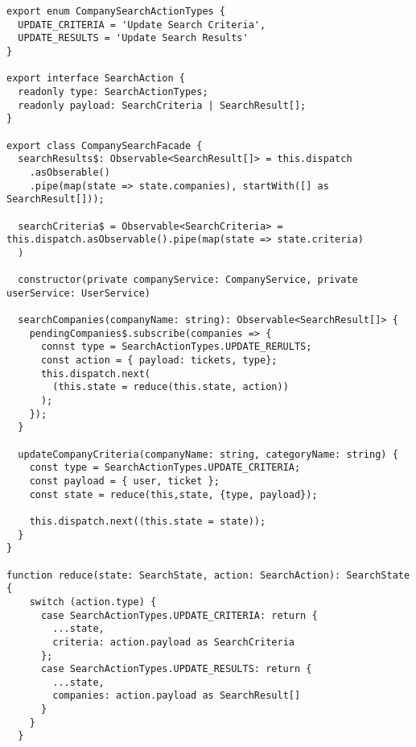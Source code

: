 \begin{lstlisting}[caption=company-search.facade.ts]
export enum CompanySearchActionTypes {
  UPDATE_CRITERIA = 'Update Search Criteria',
  UPDATE_RESULTS = 'Update Search Results'
}

export interface SearchAction {
  readonly type: SearchActionTypes;
  readonly payload: SearchCriteria | SearchResult[];
}

export class CompanySearchFacade {
  searchResults$: Observable<SearchResult[]> = this.dispatch
    .asObserable() 
    .pipe(map(state => state.companies), startWith([] as SearchResult[]));

  searchCriteria$ = Observable<SearchCriteria> = this.dispatch.asObservable().pipe(map(state => state.criteria)
  ) 

  constructor(private companyService: CompanyService, private userService: UserService)
    
  searchCompanies(companyName: string): Observable<SearchResult[]> {
    pendingCompanies$.subscribe(companies => {
      connst type = SearchActionTypes.UPDATE_RERULTS;
      const action = { payload: tickets, type};
      this.dispatch.next(
        (this.state = reduce(this.state, action))
      );
    });
  }

  updateCompanyCriteria(companyName: string, categoryName: string) {
    const type = SearchActionTypes.UPDATE_CRITERIA;
    const payload = { user, ticket };
    const state = reduce(this,state, {type, payload});

    this.dispatch.next((this.state = state));
  }
}  

function reduce(state: SearchState, action: SearchAction): SearchState {
    switch (action.type) {
      case SearchActionTypes.UPDATE_CRITERIA: return {
        ...state,
        criteria: action.payload as SearchCriteria
      };
      case SearchActionTypes.UPDATE_RESULTS: return {
        ...state,
        companies: action.payload as SearchResult[]
      }
    }
  }
\end{lstlisting} 
